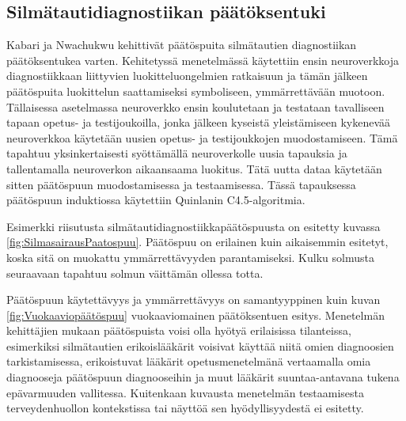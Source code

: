 \documentclass[12pt,finnish]{tktltiki2}
\theoremstyle{definition}
\theoremstyle{remark}
\begin{document}

\subsection{Silmätautidiagnostiikan päätöksentuki}
Kabari ja Nwachukwu \cite{EyeDiseaseDiagnosis} kehittivät päätöspuita silmätautien diagnostiikan päätöksentukea varten.
Kehitetyssä menetelmässä käytettiin ensin neuroverkkoja diagnostiikkaan liittyvien luokitteluongelmien ratkaisuun ja
tämän jälkeen päätöspuita luokittelun saattamiseksi symboliseen, ymmärrettävään muotoon. Tällaisessa asetelmassa neuroverkko
ensin koulutetaan ja testataan tavalliseen tapaan opetus- ja testijoukoilla, jonka jälkeen kyseistä yleistämiseen
kykenevää neuroverkkoa käytetään uusien opetus- ja testijoukkojen muodostamiseen. Tämä tapahtuu yksinkertaisesti
syöttämällä neuroverkolle uusia tapauksia ja tallentamalla neuroverkon aikaansaama luokitus. Tätä uutta dataa
käytetään sitten päätöspuun muodostamisessa ja testaamisessa. Tässä tapauksessa päätöspuun induktiossa käytettiin
Quinlanin C4.5-algoritmia.

Esimerkki riisutusta silmätautidiagnostiikkapäätöspuusta on esitetty kuvassa \ref{fig:SilmasairausPaatospuu}.
Päätöspuu on erilainen kuin aikaisemmin esitetyt, koska sitä on muokattu ymmärrettävyyden parantamiseksi.
Kulku solmusta seuraavaan tapahtuu solmun väittämän ollessa totta.

Päätöspuun käytettävyys ja ymmärrettävyys
on samantyyppinen kuin kuvan \ref{fig:Vuokaaviopäätöspuu} vuokaaviomainen päätöksentuen esitys.
Menetelmän kehittäjien mukaan päätöspuista voisi olla hyötyä erilaisissa tilanteissa, esimerkiksi
silmätautien erikoislääkärit voisivat käyttää niitä omien diagnoosien tarkistamisessa, erikoistuvat lääkärit
opetusmenetelmänä vertaamalla omia diagnooseja päätöspuun diagnooseihin ja muut lääkärit suuntaa-antavana
tukena epävarmuuden vallitessa. Kuitenkaan kuvausta menetelmän testaamisesta terveydenhuollon
kontekstissa tai näyttöä sen hyödyllisyydestä ei esitetty.
\end{document}

